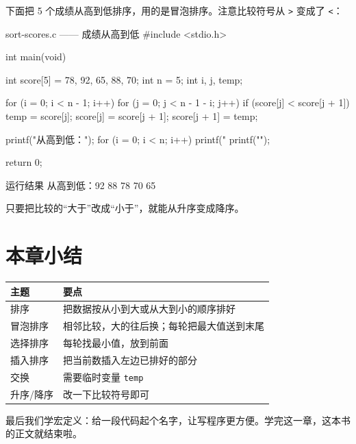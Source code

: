 下面把 5 个成绩从高到低排序，用的是冒泡排序。注意比较符号从 \texttt{>} 变成了 \texttt{<}：

\begin{codebox}{sort-scores.c —— 成绩从高到低}
#include <stdio.h>

int main(void)
{
    int score[5] = {78, 92, 65, 88, 70};
    int n = 5;
    int i, j, temp;

    for (i = 0; i < n - 1; i++) {
        for (j = 0; j < n - 1 - i; j++) {
            if (score[j] < score[j + 1]) {
                temp = score[j];
                score[j] = score[j + 1];
                score[j + 1] = temp;
            }
        }
    }

    printf("从高到低：");
    for (i = 0; i < n; i++) {
        printf("%
    }
    printf("\n");

    return 0;
}
\end{codebox}

\begin{outbox}{运行结果}
从高到低：92 88 78 70 65
\end{outbox}

只要把比较的“大于”改成“小于”，就能从升序变成降序。

\section{本章小结}

\begin{center}
\begin{tabular}{@{}p{}p{}@{}}
\toprule
主题 & 要点 \\
\midrule
排序 & 把数据按从小到大或从大到小的顺序排好 \\
冒泡排序 & 相邻比较，大的往后换；每轮把最大值送到末尾 \\
选择排序 & 每轮找最小值，放到前面 \\
插入排序 & 把当前数插入左边已排好的部分 \\
交换 & 需要临时变量 \texttt{temp} \\
升序/降序 & 改一下比较符号即可 \\
\bottomrule
\end{tabular}
\end{center}

\begin{tipbox}[下一章预告]
最后我们学宏定义：给一段代码起个名字，让写程序更方便。学完这一章，这本书的正文就结束啦。
\end{tipbox}

